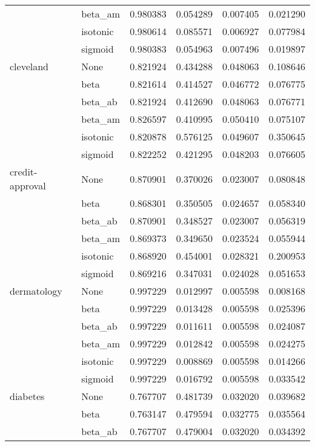 \begin{tabular}{llrrrr}
        & beta\_am &  0.980383 &  0.054289 &  0.007405 &  0.021290 \\
        & isotonic &  0.980614 &  0.085571 &  0.006927 &  0.077984 \\
        & sigmoid &  0.980383 &  0.054963 &  0.007496 &  0.019897 \\
cleveland & None &  0.821924 &  0.434288 &  0.048063 &  0.108646 \\
        & beta &  0.821614 &  0.414527 &  0.046772 &  0.076775 \\
        & beta\_ab &  0.821924 &  0.412690 &  0.048063 &  0.076771 \\
        & beta\_am &  0.826597 &  0.410995 &  0.050410 &  0.075107 \\
        & isotonic &  0.820878 &  0.576125 &  0.049607 &  0.350645 \\
        & sigmoid &  0.822252 &  0.421295 &  0.048203 &  0.076605 \\
credit-approval & None &  0.870901 &  0.370026 &  0.023007 &  0.080848 \\
        & beta &  0.868301 &  0.350505 &  0.024657 &  0.058340 \\
        & beta\_ab &  0.870901 &  0.348527 &  0.023007 &  0.056319 \\
        & beta\_am &  0.869373 &  0.349650 &  0.023524 &  0.055944 \\
        & isotonic &  0.868920 &  0.454001 &  0.028321 &  0.200953 \\
        & sigmoid &  0.869216 &  0.347031 &  0.024028 &  0.051653 \\
dermatology & None &  0.997229 &  0.012997 &  0.005598 &  0.008168 \\
        & beta &  0.997229 &  0.013428 &  0.005598 &  0.025396 \\
        & beta\_ab &  0.997229 &  0.011611 &  0.005598 &  0.024087 \\
        & beta\_am &  0.997229 &  0.012842 &  0.005598 &  0.024275 \\
        & isotonic &  0.997229 &  0.008869 &  0.005598 &  0.014266 \\
        & sigmoid &  0.997229 &  0.016792 &  0.005598 &  0.033542 \\
diabetes & None &  0.767707 &  0.481739 &  0.032020 &  0.039682 \\
        & beta &  0.763147 &  0.479594 &  0.032775 &  0.035564 \\
        & beta\_ab &  0.767707 &  0.479004 &  0.032020 &  0.034392 \\

\end{tabular}
